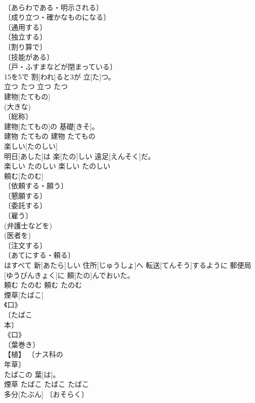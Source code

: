 \documentclass[8pt]{extreport}
\begin{document}
\begin{CJK}{UTF8}{min}
\\	〔あらわである・明示される〕 
\\	〔成り立つ・確かなものになる〕 
\\	〔通用する〕 
\\	〔独立する〕 
\\	〔割り算で〕 
\\	〔技能がある〕 
\\	〔戸・ふすまなどが閉まっている〕 
\\	15を5で 割[われ]ると3が 立[た]つ。	
\\	立つ	たつ	立つ	たつ	
\\	建物[たてもの]	
\\	(大きな) 
\\	〔総称〕 
\\	建物[たてもの]の 基礎[きそ]。	
\\	建物	たてもの	建物	たてもの	
\\	楽しい[たのしい]	
\\	明日[あした]は 楽[たの]しい 遠足[えんそく]だ。	
\\	楽しい	たのしい	楽しい	たのしい	
\\	頼む[たのむ]	
\\	〔依頼する・願う〕 
\\	〔懇願する〕 
\\	〔委託する〕 
\\	〔雇う〕 
\\	(弁護士などを) 
\\	(医者を) 
\\	〔注文する〕 
\\	〔あてにする・頼る〕 
\\	[《口》 
\\	〔…に訴える〕 
\\	手紙[てがみ]はすべて 新[あたら]しい 住所[じゅうしょ]へ 転送[てんそう]するように 郵便局[ゆうびんきょく]に 頼[たの]んでおいた。	
\\	頼む	たのむ	頼む	たのむ	
\\	煙草[たばこ]	
\\	《口》 
\\	〔たばこ 
\\	本〕 
\\	《口》 
\\	〔葉巻き〕 
\\	【植】 〔ナス科の 
\\	年草〕 
\\	たばこの 葉[は]。	
\\	煙草	たばこ	たばこ	たばこ	
\\	多分[たぶん]	〔おそらく〕 

\end{CJK}
\end{document}
